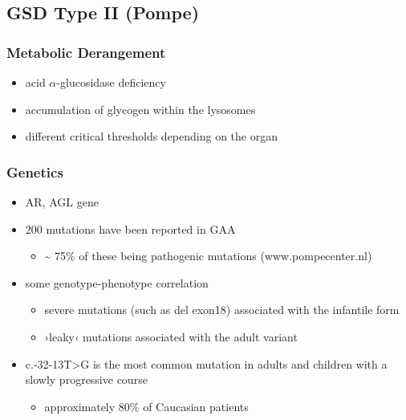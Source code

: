 \documentclass{scrartcl}
\begin{document}
\subsection{GSD Type II (Pompe)}
\label{sec:orgc676f3b}
\subsubsection{Metabolic Derangement}
\label{sec:org10a1ae6}
\begin{itemize}
\item acid \(\alpha\)-glucosidase deficiency
\item accumulation of glycogen within the lysosomes
\item different critical thresholds depending on the organ
\end{itemize}
\subsubsection{Genetics}
\label{sec:orga9aede7}
\begin{itemize}
\item AR, AGL gene
\item 200 mutations have been reported in GAA
\begin{itemize}
\item \textasciitilde{} 75\% of these being pathogenic mutations (www.pompecenter.nl)
\end{itemize}
\item some genotype-phenotype correlation
\begin{itemize}
\item severe mutations (such as del exon18) associated with the infantile form
\item ›leaky‹ mutations associated with the adult variant
\end{itemize}
\item c.-32-13T>G is the most common mutation in adults and children with
a slowly progressive course
\begin{itemize}
\item approximately 80\% of Caucasian patients
\end{itemize}
\end{itemize}
\end{document}
